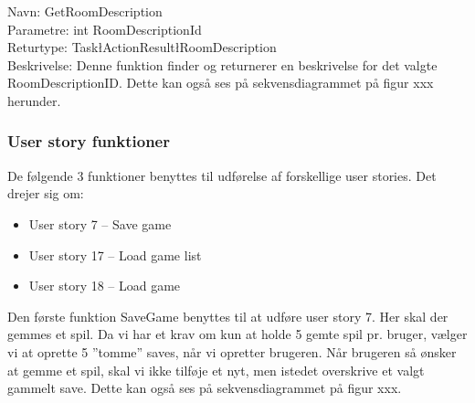 Navn: GetRoomDescription \\
Parametre: int RoomDescriptionId \\
Returtype: Task\l ActionResult\l RoomDescription\g\g \\
Beskrivelse: Denne funktion finder og returnerer en beskrivelse for det valgte RoomDescriptionID. 
Dette kan også ses på sekvensdiagrammet på figur xxx herunder.


\subsubsection{User story funktioner}
De følgende 3 funktioner benyttes til udførelse af forskellige user stories.
Det drejer sig om:
\begin{itemize}
\item User story 7 – Save game
\item User story 17 – Load game list
\item User story 18 – Load game \\
\end{itemize}

Den første funktion SaveGame benyttes til at udføre user story 7.
Her skal der gemmes et spil.
Da vi har et krav om kun at holde 5 gemte spil pr. bruger, vælger vi at oprette 5 ”tomme” saves, når vi opretter brugeren.  
Når brugeren så ønsker at gemme et spil, skal vi ikke tilføje et nyt, men istedet overskrive et valgt gammelt save.
Dette kan også ses på sekvensdiagrammet på figur xxx.\\


